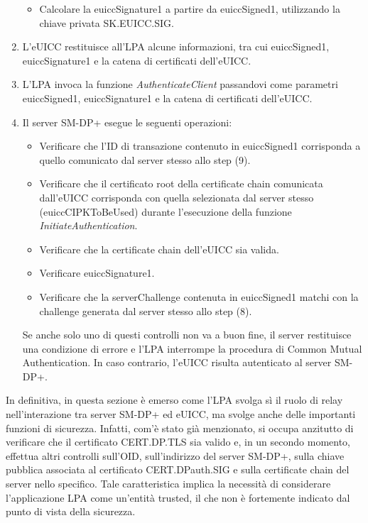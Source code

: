 \documentclass[10pt, oneside]{book}
\begin{document}
\begin{enumerate}
\begin{itemize}[itemsep=0pt]
\item Calcolare la euiccSignature1 a partire da euiccSigned1, utilizzando la chiave privata SK.EUICC.SIG.
\end{itemize}
\item L'eUICC restituisce all'LPA alcune informazioni, tra cui euiccSigned1, euiccSignature1 e la catena di certificati dell'eUICC.
\item L'LPA invoca la funzione \textit{AuthenticateClient} passandovi come parametri euiccSigned1, euiccSignature1 e la catena di certificati dell'eUICC.
\item Il server SM-DP+ esegue le seguenti operazioni:
\begin{itemize}[itemsep=0pt]
\item Verificare che l'ID di transazione contenuto in euiccSigned1 corrisponda a quello comunicato dal server stesso allo step (9).
\item Verificare che il certificato root della certificate chain comunicata dall'eUICC corrisponda con quella selezionata dal server stesso (euiccCIPKToBeUsed) durante l'esecuzione della funzione \textit{InitiateAuthentication}.
\item Verificare che la certificate chain dell'eUICC sia valida.
\item Verificare euiccSignature1.
\item Verificare che la serverChallenge contenuta in euiccSigned1 matchi con la challenge generata dal server stesso allo step (8).
\end{itemize}
Se anche solo uno di questi controlli non va a buon fine, il server restituisce una condizione di errore e l'LPA interrompe la procedura di Common Mutual Authentication. In caso contrario, l'eUICC risulta autenticato al server SM-DP+.
\end{enumerate}
In definitiva, in questa sezione è emerso come l'LPA svolga sì il ruolo di relay nell'interazione tra server SM-DP+ ed eUICC, ma svolge anche delle importanti funzioni di sicurezza. Infatti, com'è stato già menzionato, si occupa anzitutto di verificare che il certificato CERT.DP.TLS sia valido e, in un secondo momento, effettua altri controlli sull'OID, sull'indirizzo del server SM-DP+, sulla chiave pubblica associata al certificato CERT.DPauth.SIG e sulla certificate chain del server nello specifico. Tale caratteristica implica la necessità di considerare l'applicazione LPA come un'entità trusted, il che non è fortemente indicato dal punto di vista della sicurezza.
\end{document}
